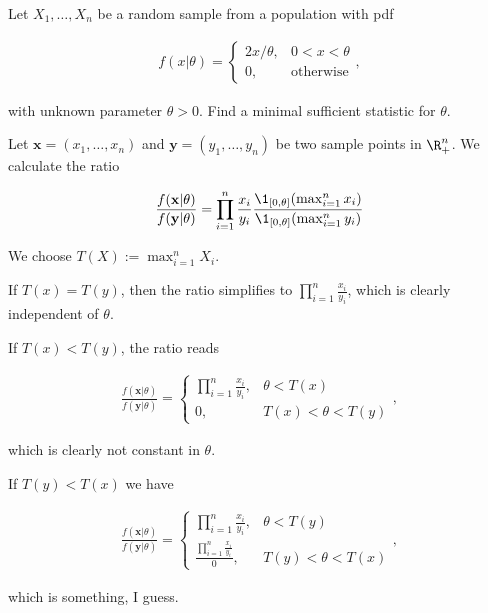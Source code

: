 
\begin{exercise}

Let $X_1,\dots,X_n$ be a random sample from a population with pdf

\begin{align*}
  f(x|\theta) = \begin{cases}
    2x/\theta, & 0 < x < \theta \\
    0, & \text{otherwise}
  \end{cases},
\end{align*}

with unknown parameter $\theta > 0$. Find a minimal sufficient statistic
for $\theta$.
\end{exercise}


\begin{solution}

  Let $\textbf{x} = (x_1,\dots,x_n)$ and $\textbf{y} = (y_1,\dots,y_n)$ 
  be two sample points in $\R_+^n$. We calculate the ratio

  \begin{align*}
    \frac{f(\textbf{x}|\theta)}{f(\textbf{y}|\theta)} = \prod_{i=1}^n\frac{x_i}{y_i}
    \frac{\1_{[0, \theta]}(\max_{i=1}^n x_i)}{\1_{[0, \theta]}(\max_{i=1}^n y_i)}
  \end{align*}

  We choose $T(X) := \max_{i=1}^n X_i$. 

  If $T(x) = T(y)$, then the ratio simplifies to $\prod_{i=1}^n\frac{x_i}{y_i}$,
  which is clearly independent of $\theta$.

  If $T(x) < T(y)$, the ratio reads

  \begin{align*}
    \frac{f(\textbf{x}|\theta)}{f(\textbf{y}|\theta)} =
    \begin{cases}
      \prod_{i=1}^n\frac{x_i}{y_i}, & \theta < T(x) \\
      0, & T(x) < \theta < T(y)
    \end{cases},
  \end{align*}

  which is clearly not constant in $\theta$.

  If $T(y) < T(x)$ we have

  \begin{align*}
    \frac{f(\textbf{x}|\theta)}{f(\textbf{y}|\theta)} =
    \begin{cases}
      \prod_{i=1}^n\frac{x_i}{y_i}, & \theta < T(y) \\
      \frac{\prod_{i=1}^n\frac{x_i}{y_i}}{0}, & T(y) < \theta < T(x)
    \end{cases},
  \end{align*}

  which is something, I guess.
\end{solution}

